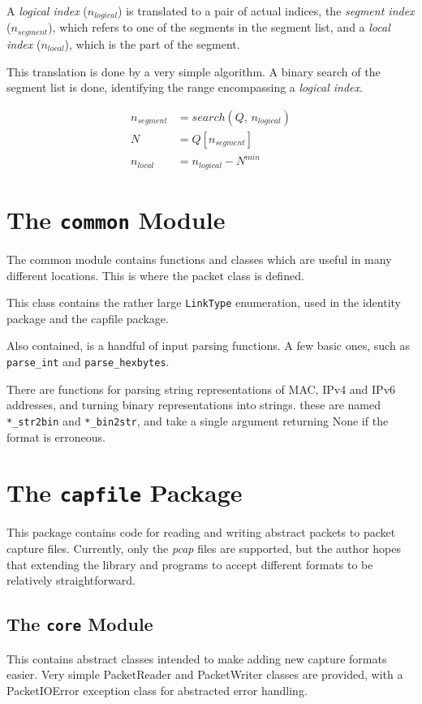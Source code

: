 \documentclass[10pt,a4paper,notitlepage]{report}
\begin{document}
A \emph{logical index} ($n_{logical}$) is translated to a pair of actual indices, the \emph{segment index} ($n_{segment}$), which refers to one of the segments in the segment list, and a \emph{local index} ($n_{local}$), which is the part of the segment.

This translation is done by a very simple algorithm. A binary search of the segment list is done, identifying the range encompassing a \emph{logical index}.

\begin{align*}
n_{segment} &= search(Q,\,n_{logical})\\
N &= Q[n_{segment}]\\
n_{local} &= n_{logical} - N^{min}
\end{align*}

\section{The \texttt{common} Module}
The common module contains functions and classes which are useful in many different locations.
This is where the packet class is defined.

This class contains the rather large \texttt{LinkType} enumeration, used in the identity package and the capfile package.

Also contained, is a handful of input parsing functions. A few basic ones, such as \texttt{parse_int} and \texttt{parse_hexbytes}.

There are functions for parsing string representations of MAC, IPv4 and IPv6 addresses, and turning binary representations into strings. these are named \texttt{*_str2bin} and \texttt{*_bin2str}, and take a single argument returning None if the format is erroneous.

\section{The \texttt{capfile} Package}
This package contains code for reading and writing abstract packets to packet capture files. Currently, only the \emph{pcap} files are supported, but the author hopes that extending the library and programs to accept different formats to be relatively straightforward.
 
\subsection{The \texttt{core} Module}
This contains abstract classes intended to make adding new capture formats easier. Very simple PacketReader and PacketWriter classes are provided, with a PacketIOError exception class for abstracted error handling.
\end{document}
